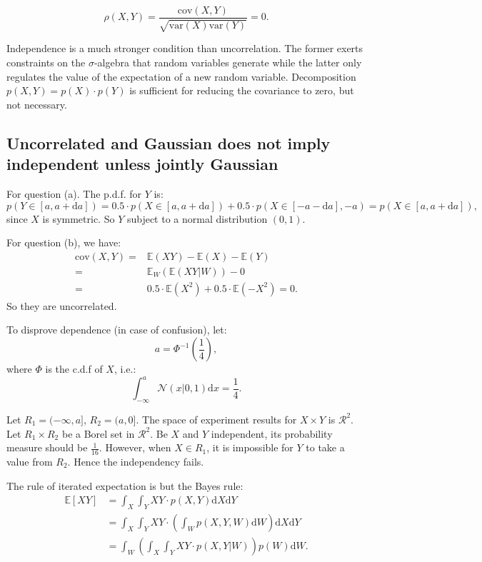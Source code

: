 \documentclass[UTF8]{ctexart}
\begin{document}
$$\rho(X,Y)=\frac{\text{cov}(X,Y)}{\sqrt{\text{var}(X)\text{var}(Y)}}=0.$$

Independence is a much stronger condition than uncorrelation.
The former exerts constraints on the $\sigma$-algebra that random variables generate while the latter only regulates the value of the expectation of a new random variable.
Decomposition $p(X,Y)=p(X)\cdot p(Y)$ is sufficient for reducing the covariance to zero, but not necessary.

\subsection{Uncorrelated and Gaussian does not imply independent unless jointly Gaussian}
For question (a).
The p.d.f. for $Y$ is:
$$p(Y\in[a,a+\text{d}a])=0.5 \cdot p(X\in[a,a+\text{d}a]) + 0.5 \cdot p(X\in[-a-\text{d}a],-a)=p(X\in[a,a+\text{d}a]),$$
since $X$ is symmetric.
So $Y$ subject to a normal distribution $(0,1)$.

For question (b), we have:
\begin{align}
\text{cov}(X,Y)=&\mathbb{E}(XY)-\mathbb{E}(X)-\mathbb{E}(Y) \nonumber \\
=& \mathbb{E}_{W}(\mathbb{E}(XY|W)) - 0 \nonumber \\
=&0.5\cdot\mathbb{E}(X^{2})+0.5\cdot\mathbb{E}(-X^{2})=0. \nonumber
\end{align}
So they are uncorrelated.

To disprove dependence (in case of confusion), let:
$$a=\Phi^{-1}(\frac{1}{4}),$$
where $\Phi$ is the c.d.f of $X$, i.e.:
$$\int_{-\infty}^{a}\mathcal{N}(x|0,1)\text{d}x=\frac{1}{4}.$$

Let $R_{1}=(-\infty,a]$, $R_{2}=(a,0]$.
The space of experiment results for $X\times Y$ is $\mathcal{R}^{2}$.
Let $R_{1}\times R_{2}$ be a Borel set in $\mathcal{R}^{2}$.
Be $X$ and $Y$ independent, its probability measure should be $\frac{1}{16}$.
However, when $X\in R_{1}$, it is impossible for $Y$ to take a value from $R_{2}$. Hence the independency fails.

The rule of iterated expectation is but the Bayes rule:
$$
\begin{aligned}
\mathbb{E}[XY]&=\int_{X}\int_{Y}XY\cdot p(X,Y)\text{d}X\text{d}Y\\
&=\int_{X}\int_{Y}XY\cdot \left(\int_{W} p(X,Y,W)\text{d}W\right)\text{d}X\text{d}Y\\
&=\int_{W}\left(\int_{X}\int_{Y} XY\cdot p(X,Y|W)    \right)p(W)\text{d}W.
\end{aligned}
$$
\end{document}
